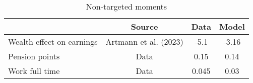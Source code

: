 \begin{table}[htbp]\caption{Non-targeted moments}\label{table:nontargeted_moments}\centering\footnotesize\begin{tabular}{lccc} \toprule  &  Source& Data & Model  \\\midrule    Wealth effect on earnings      & Artmann et al. (2023)          & -5.1 &-3.16\\ Pension points                & Data                           & 0.15 &0.14\\ Work full time              & Data                             & 0.045 &0.03\\  \bottomrule\end{tabular}\end{table}